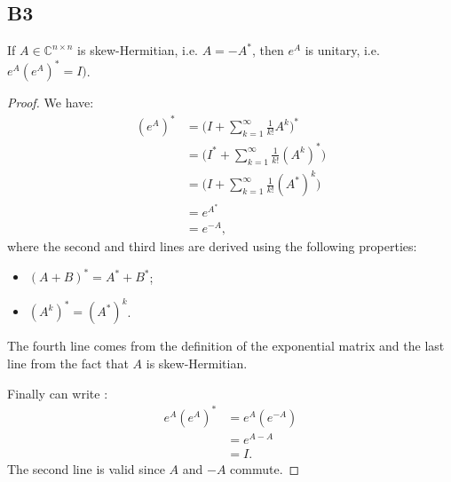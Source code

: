\documentclass[11pt]{article}
\newcommand{\complex}{\mathbb{C}} %
\begin{document}
\subsection*{B3}
If \(A \in \complex^{n \times n}\) is skew-Hermitian, i.e. $A=-A^*$, then $e^A$ is unitary, i.e. $e^A(e^A)^*=I)$.
\begin{proof}
We have:
\begin{align*}
    (e^A)^*&=\Bigg(I+\sum^{\infty}_{k=1}\frac{1}{k!}A^k\Bigg)^{*}\\
    &=\Bigg(I^{*}+\sum^{\infty}_{k=1}\frac{1}{k!}(A^k)^{*}\Bigg)\\
    &=\Bigg(I+\sum^{\infty}_{k=1}\frac{1}{k!}(A^{*})^k\Bigg)\\
    &=e^{A^{*}}\\
    &=e^{-A},
\end{align*}
where the second and third lines are derived using the following properties:
\begin{itemize}
    \item $(A+B)^{*}=A^{*}+B^{*}$;
    \item $(A^k)^*=(A^*)^k$.
\end{itemize}
The fourth line comes from the definition of the exponential matrix and the last line from the fact that \(A\) is skew-Hermitian.

Finally can write :
\begin{align*}
    e^A(e^A)^*&=e^A(e^{-A})\\
    &=e^{A-A}\\
    &=I.
\end{align*}
The second line is valid since \(A\) and \(-A\) commute.
\end{proof}
\end{document}
